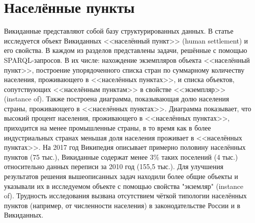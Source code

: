 \chapter{Населённые пункты}
\label{ch:human-settlement}

	Викиданные представляют собой базу структурированных данных. В статье исследуется объект Викиданных <<населённый пункт>> (human settlement) и его свойства. 
В каждом из разделов представлены задачи, решённые с помощью SPARQL-запросов. В их числе: нахождение экземпляров объекта <<населённый пункт>>, построение
упорядоченного списка стран по суммарному количеству населения, проживающего в <<населённых пунктах>>, и списка объектов, сопутствующих <<населённым 
пунктам>> в свойстве <<экземпляр>> (instance of). Также построена диаграмма, показывающая долю населения страны, проживающего в <<населённых пунктах>>. 
Диаграмма показывает, что высокий процент населения, проживающего в <<населённых пунктах>>, приходится на менее промышленные страны, в то время как в более 
индустриальных странах меньшая доля населения проживает в <<населённых пунктах>>. На 2017 год Википедия описывает примерно половину населённых пунктов 
(75 тыс.), Викиданные содержат менее 3\% таких поселений (4 тыс.) относительно данных переписи за 2010 год (155,5 тыс.). Для улучшения результатов решения 
вышеописанных задач находили более общие объекты и указывали их в исследуемом объекте с помощью свойства "экземляр" (instance of). Трудность исследования 
вызвана отсутствием чёткой типологии населённых пунктов (например, от численности населения) в законодательстве России и в Викиданных.
